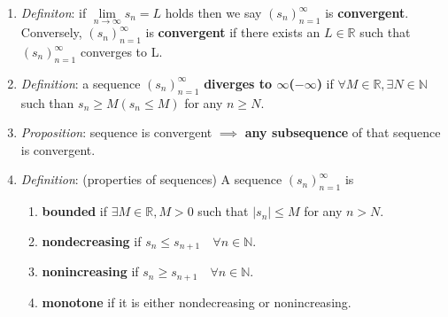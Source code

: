 \message{ !name(cheatsheet.tex)}\documentclass{article}
\newcommand{\seqn}[1]{(#1)^\infty_{n=1}}
\newcommand{\real}{\mathbb{R}}
\newcommand{\nat}{\mathbb{N}}
\begin{document}
\begin{multicols*}{3}
\begin{enumerate}
		\item \emph{Definiton}: if $\lim\limits_{n\rightarrow\infty}s_n=L$
		      holds then we say $\seqn{s_n}$ is \textbf{convergent}. Conversely,
		      $\seqn{s_n}$ is \textbf{convergent} if
		      there exists an $L\in\real$ such that $\seqn{s_n}$ converges to L.
		\item \emph{Definition}: a sequence $\seqn{s_n}$ \textbf{diverges to
			      $\infty$($-\infty$)} if $\forall M\in\real,\exists N\in\nat$ such
		      than $s_n\geq M (s_n\leq M)$ for any $n\geq N$.
		\item \emph{Proposition}: sequence is convergent $\implies$ \textbf{any
			      subsequence} of that sequence is convergent.
		\item \emph{Definition}: (properties of sequences) A sequence
		      $\seqn{s_n}$ is
		      \begin{enumerate}
			      \item \textbf{bounded} if $\exists M\in\real,M>0$ such that
			            $|s_n|\leq M$ for any $n>N$.
			      \item \textbf{nondecreasing} if $s_n\leq s_{n+1}\quad\forall
				            n\in\nat$.
			      \item \textbf{nonincreasing} if $s_n\geq s_{n+1}\quad\forall
				            n\in\nat$.
			      \item \textbf{monotone} if it is either nondecreasing or
			            nonincreasing.
		      \end{enumerate}


\end{enumerate}
\end{multicols*}
\end{document}
